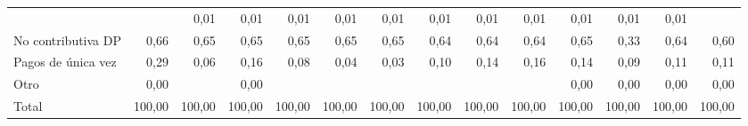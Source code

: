 \begin{tabular}{llllllllllllll}
  \multicolumn{1}{|r}{} &
  \multicolumn{1}{r}{} &
  \multicolumn{1}{r}{0,01} &
  \multicolumn{1}{r}{0,01} &
  \multicolumn{1}{r}{0,01} &
  \multicolumn{1}{r}{0,01} &
  \multicolumn{1}{r}{0,01} &
  \multicolumn{1}{r}{0,01} &
  \multicolumn{1}{r}{0,01} &
  \multicolumn{1}{r}{0,01} &
  \multicolumn{1}{r}{0,01} &
  \multicolumn{1}{r}{0,01} &
  \multicolumn{1}{r}{0,01} \\
\multicolumn{1}{l}{\hspace{1em}No contributiva DP} &
  \multicolumn{1}{|r}{0,66} &
  \multicolumn{1}{r}{0,65} &
  \multicolumn{1}{r}{0,65} &
  \multicolumn{1}{r}{0,65} &
  \multicolumn{1}{r}{0,65} &
  \multicolumn{1}{r}{0,65} &
  \multicolumn{1}{r}{0,64} &
  \multicolumn{1}{r}{0,64} &
  \multicolumn{1}{r}{0,64} &
  \multicolumn{1}{r}{0,65} &
  \multicolumn{1}{r}{0,33} &
  \multicolumn{1}{r}{0,64} &
  \multicolumn{1}{r}{0,60} \\
\multicolumn{1}{l}{\hspace{1em}Pagos de única vez} &
  \multicolumn{1}{|r}{0,29} &
  \multicolumn{1}{r}{0,06} &
  \multicolumn{1}{r}{0,16} &
  \multicolumn{1}{r}{0,08} &
  \multicolumn{1}{r}{0,04} &
  \multicolumn{1}{r}{0,03} &
  \multicolumn{1}{r}{0,10} &
  \multicolumn{1}{r}{0,14} &
  \multicolumn{1}{r}{0,16} &
  \multicolumn{1}{r}{0,14} &
  \multicolumn{1}{r}{0,09} &
  \multicolumn{1}{r}{0,11} &
  \multicolumn{1}{r}{0,11} \\
\multicolumn{1}{l}{\hspace{1em}Otro} &
  \multicolumn{1}{|r}{0,00} &
  \multicolumn{1}{r}{} &
  \multicolumn{1}{r}{0,00} &
  \multicolumn{1}{r}{} &
  \multicolumn{1}{r}{} &
  \multicolumn{1}{r}{} &
  \multicolumn{1}{r}{} &
  \multicolumn{1}{r}{} &
  \multicolumn{1}{r}{} &
  \multicolumn{1}{r}{0,00} &
  \multicolumn{1}{r}{0,00} &
  \multicolumn{1}{r}{0,00} &
  \multicolumn{1}{r}{0,00} \\
\multicolumn{1}{l}{\hspace{1em}Total} &
  \multicolumn{1}{|r}{100,00} &
  \multicolumn{1}{r}{100,00} &
  \multicolumn{1}{r}{100,00} &
  \multicolumn{1}{r}{100,00} &
  \multicolumn{1}{r}{100,00} &
  \multicolumn{1}{r}{100,00} &
  \multicolumn{1}{r}{100,00} &
  \multicolumn{1}{r}{100,00} &
  \multicolumn{1}{r}{100,00} &
  \multicolumn{1}{r}{100,00} &
  \multicolumn{1}{r}{100,00} &
  \multicolumn{1}{r}{100,00} &
  \multicolumn{1}{r}{100,00} \\
\cline{1-14}
\end{tabular}
